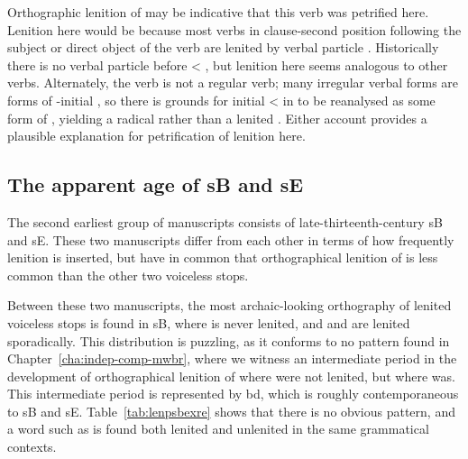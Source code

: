 Orthographic lenition of  may be indicative that this verb was petrified here. Lenition here would be because most verbs in clause-second position following the subject or direct object of the verb are lenited by  verbal particle . Historically there is no verbal particle before  < , but lenition here seems analogous to other verbs. Alternately, the verb  is not a regular verb; many irregular verbal forms are forms of -initial , so there is grounds for initial  <  in  to be reanalysed as some form of , yielding a radical  rather than a lenited . Either account provides a plausible explanation for petrification of lenition here.

\subsection{The apparent age of \gls{sB} and \gls{sE}}
\label{sec:apparent-age-glssb}
The second earliest group of manuscripts consists of late-thirteenth-century \gls{sB} and \gls{sE}. These two manuscripts differ from each other in terms of how frequently lenition is inserted, but have in common that orthographical lenition of  is less common than the other two voiceless stops.

Between these two manuscripts, the most archaic-looking orthography of lenited voiceless stops is found in \gls{sB}, where  is never lenited, and  and  are lenited sporadically. This distribution is puzzling, as it conforms to no pattern found in Chapter~\ref{cha:indep-comp-mwbr}, where we witness an intermediate period in the development of orthographical lenition of  where  were not lenited, but where  was. This intermediate period is represented by \gls{bd}, which is roughly contemporaneous to \gls{sB} and \gls{sE}. Table~\ref{tab:lenpsbexre} shows that there is no obvious pattern, and a word such as  is found both lenited and unlenited in the same grammatical contexts.

